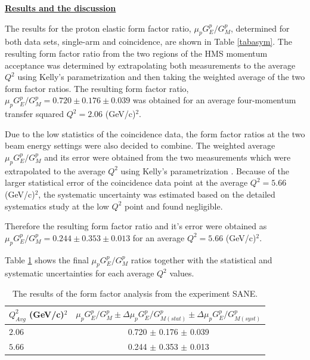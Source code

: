 \documentclass[12pt]{article}
\begin{document}
{
\raggedleft
\underline{\textbf{Results and the discussion}}
}

The results for the proton elastic form factor ratio, $\mu_p G_E^p/G_M^p$, determined for both data sets, single-arm and coincidence, are shown in Table \ref{tabasym}. The resulting form factor ratio from the two regions of the HMS momentum acceptance was determined by extrapolating both measurements to the average $Q^2$ using Kelly's parametrization \cite{99} and then taking the weighted average of the two form factor ratios. The resulting form factor ratio, $\mu_p G_E^p/G_M^p=0.720\pm0.176\pm0.039$ was obtained for an average four-momentum transfer squared $Q^2=2.06$ (GeV/c)$^2$.

Due to the low statistics of the coincidence data, the form factor ratios at the two beam energy settings were also decided to combine. The weighted average $\mu_p G_E^p/G_M^p$ and its error were obtained from the two measurements which were extrapolated to the average $Q^2$ using Kelly's parametrization \cite{99}. Because of the larger statistical error of the coincidence data point at the average $Q^2=5.66$ (GeV/c)$^2$, the systematic uncertainty was estimated based on the detailed systematics study at the low $Q^2$ point and found negligible.

Therefore the resulting form factor ratio and it's error were obtained as $\mu_p G_E^p/G_M^p=0.244\pm0.353\pm0.013$ for an average $Q^2=5.66$ (GeV/c)$^2$.

Table \ref{final} shows the final $\mu_p G_E^p/G_M^p$ ratios together with the statistical and systematic uncertainties for each  average $Q^2$ values.  
  \begin{table}[htbp]
   \centering
   \begin{tabular}{|l|c|} 
      \hline
      $Q^2_{Avg}$ (GeV/c)$^2$     & $\mu_p G_E^p/G_M^p \pm \Delta \mu_p G_E^p/G_{M(stat)}^p \pm \Delta \mu_p G_E^p/G_{M(syst)}^p$\\
      \hline
      $2.06$                            &  0.720 $\pm$ 0.176 $\pm $ 0.039  \\
      $5.66$                            &  0.244 $\pm$ 0.353  $\pm $ 0.013  \\     
      \hline
  \end{tabular}
     \vspace{-0.1cm}
   \caption{The results of the form factor analysis from the experiment SANE.}
   \label{final}
   \end{table}
\end{document}
